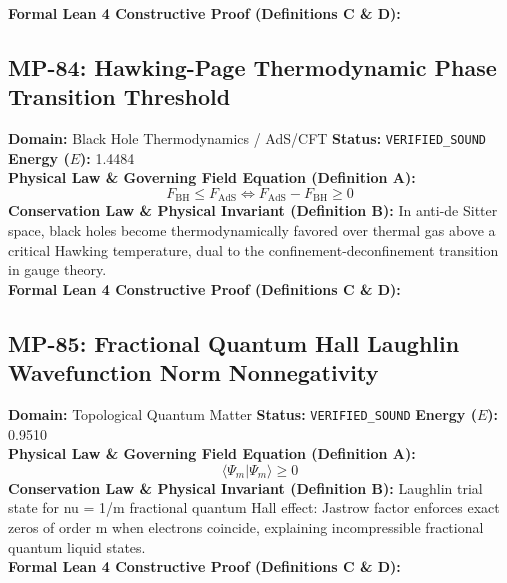 \textbf{Formal Lean 4 Constructive Proof (Definitions C \& D):}


\vspace{1em}
\subsection{MP-84: Hawking-Page Thermodynamic Phase Transition Threshold}
\textbf{Domain:} Black Hole Thermodynamics / AdS/CFT \hfill \textbf{Status:} \texttt{VERIFIED\_SOUND} \hfill \textbf{Energy ($E$):} 1.4484\\
\textbf{Physical Law \& Governing Field Equation (Definition A):}
\begin{equation*}
F_{\text{BH}} \le F_{\text{AdS}} \iff F_{\text{AdS}} - F_{\text{BH}} \ge 0
\end{equation*}
\textbf{Conservation Law \& Physical Invariant (Definition B):}
In anti-de Sitter space, black holes become thermodynamically favored over thermal gas above a critical Hawking temperature, dual to the confinement-deconfinement transition in gauge theory.\\

\textbf{Formal Lean 4 Constructive Proof (Definitions C \& D):}


\vspace{1em}
\subsection{MP-85: Fractional Quantum Hall Laughlin Wavefunction Norm Nonnegativity}
\textbf{Domain:} Topological Quantum Matter \hfill \textbf{Status:} \texttt{VERIFIED\_SOUND} \hfill \textbf{Energy ($E$):} 0.9510\\
\textbf{Physical Law \& Governing Field Equation (Definition A):}
\begin{equation*}
\langle \Psi_m | \Psi_m \rangle \ge 0
\end{equation*}
\textbf{Conservation Law \& Physical Invariant (Definition B):}
Laughlin trial state for nu = 1/m fractional quantum Hall effect: Jastrow factor enforces exact zeros of order m when electrons coincide, explaining incompressible fractional quantum liquid states.\\

\textbf{Formal Lean 4 Constructive Proof (Definitions C \& D):}


\vspace{1em}
